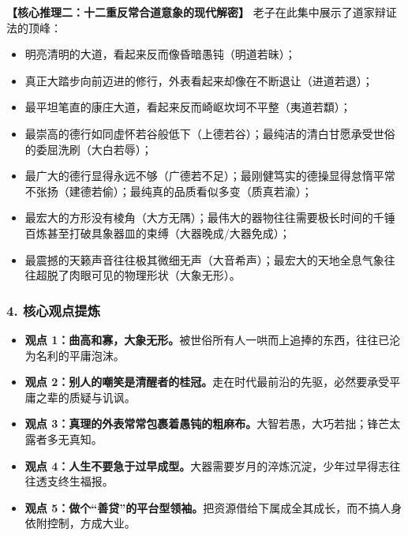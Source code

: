 \noindent\textbf{【核心推理二：十二重反常合道意象的现代解密】}
老子在此集中展示了道家辩证法的顶峰：
\begin{itemize}
    \item 明亮清明的大道，看起来反而像昏暗愚钝（明道若昧）；
    \item 真正大踏步向前迈进的修行，外表看起来却像在不断退让（进道若退）；
    \item 最平坦笔直的康庄大道，看起来反而崎岖坎坷不平整（夷道若纇）；
    \item 最崇高的德行如同虚怀若谷般低下（上德若谷）；最纯洁的清白甘愿承受世俗的委屈洗刷（大白若辱）；
    \item 最广大的德行显得永远不够（广德若不足）；最刚健笃实的德操显得怠惰平常不张扬（建德若偷）；最纯真的品质看似多变（质真若渝）；
    \item 最宏大的方形没有棱角（大方无隅）；最伟大的器物往往需要极长时间的千锤百炼甚至打破具象器皿的束缚（大器晚成/大器免成）；
    \item 最震撼的天籁声音往往极其微细无声（大音希声）；最宏大的天地全息气象往往超脱了肉眼可见的物理形状（大象无形）。
\end{itemize}

\subsubsection{4. 核心观点提炼}
\begin{itemize}
    \item \textbf{观点 1：曲高和寡，大象无形。}被世俗所有人一哄而上追捧的东西，往往已沦为名利的平庸泡沫。
    \item \textbf{观点 2：别人的嘲笑是清醒者的桂冠。}走在时代最前沿的先驱，必然要承受平庸之辈的质疑与讥讽。
    \item \textbf{观点 3：真理的外表常常包裹着愚钝的粗麻布。}大智若愚，大巧若拙；锋芒太露者多无真知。
    \item \textbf{观点 4：人生不要急于过早成型。}大器需要岁月的淬炼沉淀，少年过早得志往往透支终生福报。
    \item \textbf{观点 5：做个“善贷”的平台型领袖。}把资源借给下属成全其成长，而不搞人身依附控制，方成大业。
\end{itemize}

